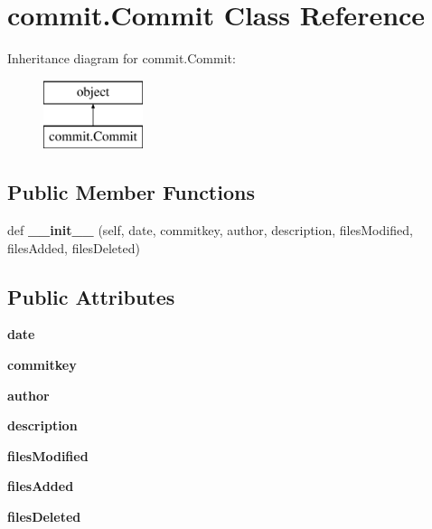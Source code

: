 \hypertarget{classcommit_1_1Commit}{}\section{commit.\+Commit Class Reference}
\label{classcommit_1_1Commit}
Inheritance diagram for commit.\+Commit\+:\begin{figure}[H]
\begin{center}
\leavevmode
\includegraphics[height=2.000000cm]{classcommit_1_1Commit}
\end{center}
\end{figure}
\subsection*{Public Member Functions}
\begin{DoxyCompactItemize}
\item 
\mbox{\label{classcommit_1_1Commit_afe9ef31d5f94f33365d591061b8d2352}} 
def {\bfseries \+\_\+\+\_\+init\+\_\+\+\_\+} (self, date, commitkey, author, description, files\+Modified, files\+Added, files\+Deleted)
\end{DoxyCompactItemize}
\subsection*{Public Attributes}
\begin{DoxyCompactItemize}
\item 
\mbox{\label{classcommit_1_1Commit_ad4bc58dc0f962ce44fee02bdfd4364a9}} 
{\bfseries date}
\item 
\mbox{\label{classcommit_1_1Commit_a3deeda387f99b8c8776b2993be70fa91}} 
{\bfseries commitkey}
\item 
\mbox{\label{classcommit_1_1Commit_af9b556e9a4eb6960290e1684e7385e3f}} 
{\bfseries author}
\item 
\mbox{\label{classcommit_1_1Commit_a634ad518846e752396621450a2e023a4}} 
{\bfseries description}
\item 
\mbox{\label{classcommit_1_1Commit_a076c59f7dd7658e346b0f1b324e897e3}} 
{\bfseries files\+Modified}
\item 
\mbox{\label{classcommit_1_1Commit_a9c1f321dc1e5eb93273e817fadee47cb}} 
{\bfseries files\+Added}
\item 
\mbox{\label{classcommit_1_1Commit_a93f616ce1afa330b887bce75e49007e4}} 
{\bfseries files\+Deleted}
\end{DoxyCompactItemize}
